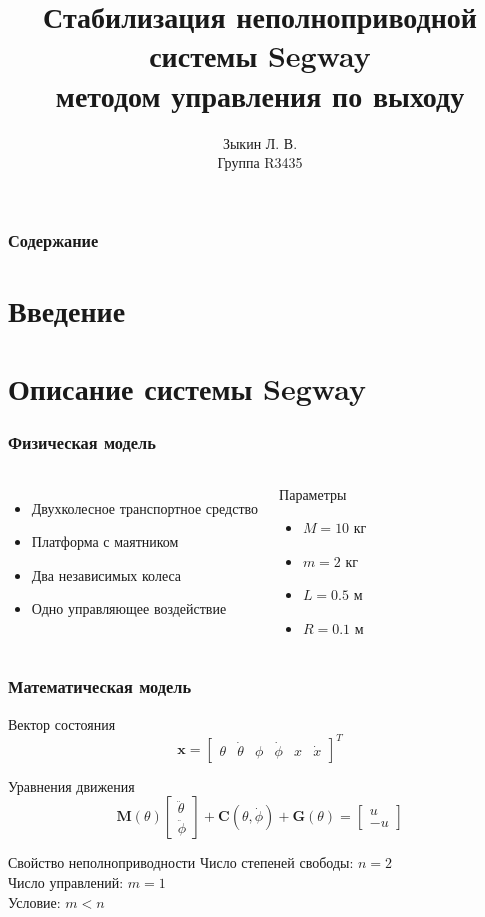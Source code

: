 \documentclass[14pt,aspectratio=169]{beamer}
\title{Стабилизация неполноприводной системы Segway \\ методом управления по выходу}
\author{Зыкин Л. В. \\ Группа R3435}
\institute{Университет ИТМО \\ Факультет систем управления и робототехники}
\date{}
\begin{document}
\frame{\titlepage}

\begin{frame}
\frametitle{Содержание}
\tableofcontents
\end{frame}

\section{Введение}

\section{Описание системы Segway}

\begin{frame}
\frametitle{Физическая модель}
\begin{columns}
\begin{itemize}
    \item Двухколесное транспортное средство
    \item Платформа с маятником
    \item Два независимых колеса
    \item Одно управляющее воздействие
\end{itemize}

\begin{block}{Параметры}
\begin{itemize}
    \item $M = 10$ кг
    \item $m = 2$ кг
    \item $L = 0.5$ м
    \item $R = 0.1$ м
\end{itemize}
\end{block}
\end{columns}
\end{frame}

\begin{frame}
\frametitle{Математическая модель}
\begin{block}{Вектор состояния}
\[
\mathbf{x} = \begin{bmatrix} \theta & \dot{\theta} & \phi & \dot{\phi} & x & \dot{x} \end{bmatrix}^T
\]
\end{block}

\begin{block}{Уравнения движения}
\[
\mathbf{M}(\theta) \begin{bmatrix} \ddot{\theta} \\ \ddot{\phi} \end{bmatrix} + \mathbf{C}(\theta, \dot{\phi}) + \mathbf{G}(\theta) = \begin{bmatrix} u \\ -u \end{bmatrix}
\]
\end{block}

\begin{block}{Свойство неполноприводности}
Число степеней свободы: $n = 2$ \\
Число управлений: $m = 1$ \\
Условие: $m < n$
\end{block}
\end{frame}
\end{document}
